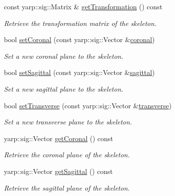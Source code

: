 \begin{DoxyCompactItemize}
const yarp\+::sig\+::\+Matrix \& \hyperlink{classassistive__rehab_1_1Skeleton_a2bdcc0d686a5a232aa2c07528cf2e647}{get\+Transformation} () const
\begin{DoxyCompactList}\small\item\em Retrieve the transformation matrix of the skeleton. \end{DoxyCompactList}\item 
bool \hyperlink{classassistive__rehab_1_1Skeleton_ab3bd697f48ea69cfdc5ff7574c19041f}{set\+Coronal} (const yarp\+::sig\+::\+Vector \&\hyperlink{classassistive__rehab_1_1Skeleton_ad042a7e60e6d72cc87b06c5fb0bdfae2}{coronal})
\begin{DoxyCompactList}\small\item\em Set a new coronal plane to the skeleton. \end{DoxyCompactList}\item 
bool \hyperlink{classassistive__rehab_1_1Skeleton_af92fdb0e3eb88a0b1dedd5038e2c6eb7}{set\+Sagittal} (const yarp\+::sig\+::\+Vector \&\hyperlink{classassistive__rehab_1_1Skeleton_a72d6ccb619619e77a17258b08496a972}{sagittal})
\begin{DoxyCompactList}\small\item\em Set a new sagittal plane to the skeleton. \end{DoxyCompactList}\item 
bool \hyperlink{classassistive__rehab_1_1Skeleton_a1aeba05a17363afc08c30397d17375df}{set\+Transverse} (const yarp\+::sig\+::\+Vector \&\hyperlink{classassistive__rehab_1_1Skeleton_ab8a9bf9297f520e8de801248e0b8d2dd}{transverse})
\begin{DoxyCompactList}\small\item\em Set a new transverse plane to the skeleton. \end{DoxyCompactList}\item 
yarp\+::sig\+::\+Vector \hyperlink{classassistive__rehab_1_1Skeleton_aa241a0ac93a9ead198f985073c8935eb}{get\+Coronal} () const
\begin{DoxyCompactList}\small\item\em Retrieve the coronal plane of the skeleton. \end{DoxyCompactList}\item 
yarp\+::sig\+::\+Vector \hyperlink{classassistive__rehab_1_1Skeleton_a83133fabc903ddd4e54edf59df977167}{get\+Sagittal} () const
\begin{DoxyCompactList}\small\item\em Retrieve the sagittal plane of the skeleton. \end{DoxyCompactList}\item 

\end{DoxyCompactItemize}
